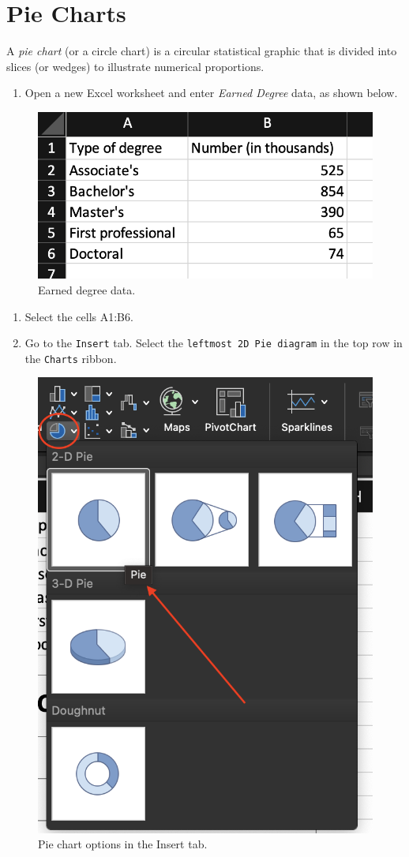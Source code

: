 \documentclass[
]{book}
\providecommand{\tightlist}{%
  \setlength{\itemsep}{0pt}\setlength{\parskip}{0pt}}
\begin{document}
\hypertarget{pie-charts}{%
\section{Pie Charts}\label{pie-charts}}

A \emph{pie chart} (or a circle chart) is a circular statistical graphic that is divided into slices (or wedges) to illustrate numerical proportions.

\begin{enumerate}
\def\labelenumi{\arabic{enumi}.}
\tightlist
\item
  Open a new Excel worksheet and enter \emph{Earned Degree} data, as shown below.
\end{enumerate}

\begin{figure}

{\centering \includegraphics[width=0.5\linewidth]{degree-earned-data} 

}

\caption{Earned degree data.}\label{fig:degree-earned-data}
\end{figure}

\begin{enumerate}
\def\labelenumi{\arabic{enumi}.}
\setcounter{enumi}{1}
\tightlist
\item
  Select the cells A1:B6.
\item
  Go to the \texttt{Insert} tab. Select the \texttt{leftmost\ 2D\ Pie\ diagram} in the top row in the \texttt{Charts} ribbon.
\end{enumerate}

\begin{figure}

{\centering \includegraphics[width=0.4\linewidth]{pie-chart} 

}

\caption{Pie chart options in the Insert tab.}\label{fig:pie-chart}
\end{figure}
\end{document}
